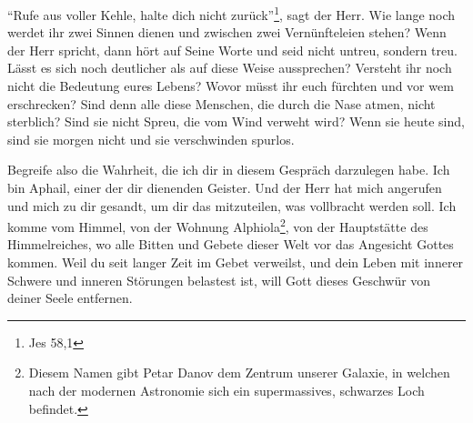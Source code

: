 "`Rufe aus voller Kehle, halte dich nicht zurück"'\footnote{Jes 58,1}, sagt der Herr. Wie lange noch werdet ihr zwei Sinnen dienen und zwischen zwei Vernünfteleien stehen? Wenn der Herr spricht, dann hört auf Seine Worte und seid nicht untreu, sondern treu. Lässt es sich noch deutlicher als auf diese Weise aussprechen? Versteht ihr noch nicht die Bedeutung eures Lebens? Wovor müsst ihr euch fürchten und vor wem erschrecken? Sind denn alle diese Menschen, die durch die Nase atmen, nicht sterblich? Sind sie nicht Spreu, die vom Wind verweht wird? Wenn sie heute sind, sind sie morgen nicht und sie verschwinden spurlos. 

Begreife also die Wahrheit, die ich dir in diesem Gespräch darzulegen habe. Ich bin Aphail, einer der dir dienenden Geister. Und der Herr hat mich angerufen und mich zu dir gesandt, um dir das mitzuteilen, was vollbracht werden soll. Ich komme vom Himmel, von der Wohnung Alphiola\footnote{Diesem Namen gibt Petar Danov dem Zentrum unserer Galaxie, in welchen nach der modernen Astronomie sich ein supermassives, schwarzes Loch befindet.}, von der Hauptstätte des Himmelreiches, wo alle Bitten und Gebete dieser Welt vor das Angesicht Gottes kommen. Weil du seit langer Zeit im Gebet verweilst, und dein Leben mit innerer Schwere und inneren Störungen belastest ist, will Gott dieses Geschwür von deiner Seele entfernen. 

